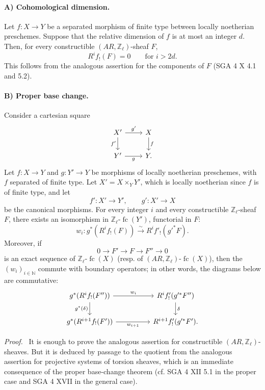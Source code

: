 \documentclass[11pt]{article}
\newenvironment{prooftext}[1][Proof]{\par\noindent\emph{#1.}\ }{\par\medskip}
\providecommand{\fc}{\operatorname{fc}}
\begin{document}
\paragraph{A) Cohomological dimension.}
Let \(f:X\to Y\) be a separated morphism of finite type between locally noetherian preschemes. Suppose that the relative dimension of \(f\) is at most an integer \(d\). Then, for every constructible \((AR,\mathbb Z_\ell)\)-sheaf \(F\),
\[
R^if_!(F)=0\qquad\text{for }i>2d.
\]
This follows from the analogous assertion for the components of \(F\) (SGA 4 X 4.1 and 5.2).

\paragraph{B) Proper base change.}
Consider a cartesian square
\[
\begin{tikzcd}
X' \arrow[r,"g'"] \arrow[d,"f'"'] & X \arrow[d,"f"]\\
Y' \arrow[r,"g"'] & Y .
\end{tikzcd}
\]
Let \(f:X\to Y\) and \(g:Y'\to Y\) be morphisms of locally noetherian preschemes, with \(f\) separated of finite type. Let \(X'=X\times_Y Y'\), which is locally noetherian since \(f\) is of finite type, and let
\[
f':X'\to Y',\qquad g':X'\to X
\]
be the canonical morphisms. For every integer \(i\) and every constructible \(\mathbb Z_\ell\)-sheaf \(F\), there exists an isomorphism in \(\mathbb Z_\ell\text{-}\fc(Y')\), functorial in \(F\):
\[
w_i:g^*(R^if_!(F))\xrightarrow{\sim} R^if'_!(g'^*F).
\]
Moreover, if
\[
0\longrightarrow F'\longrightarrow F\longrightarrow F''\longrightarrow 0
\]
is an exact sequence of \(\mathbb Z_\ell\text{-}\fc(X)\) (resp. of \((AR,\mathbb Z_\ell)\text{-}\fc(X)\)), then the \((w_i)_{i\in\mathbb N}\) commute with boundary operators; in other words, the diagrams below are commutative:
\[
\begin{tikzcd}[column sep=huge]
g^*(R^if_!(F'')) \arrow[r,"w_i"] \arrow[d,"g^*(\delta)"']
&
R^if'_!(g'^*F'') \arrow[d,"\delta"]\\
g^*(R^{i+1}f_!(F')) \arrow[r,"w_{i+1}"']
&
R^{i+1}f'_!(g'^*F').
\end{tikzcd}
\]

\begin{prooftext}[Proof]
It is enough to prove the analogous assertion for constructible \((AR,\mathbb Z_\ell)\)-sheaves. But it is deduced by passage to the quotient from the analogous assertion for projective systems of torsion sheaves, which is an immediate consequence of the proper base-change theorem (cf. SGA 4 XII 5.1 in the proper case and SGA 4 XVII in the general case).
\end{prooftext}
\end{document}

